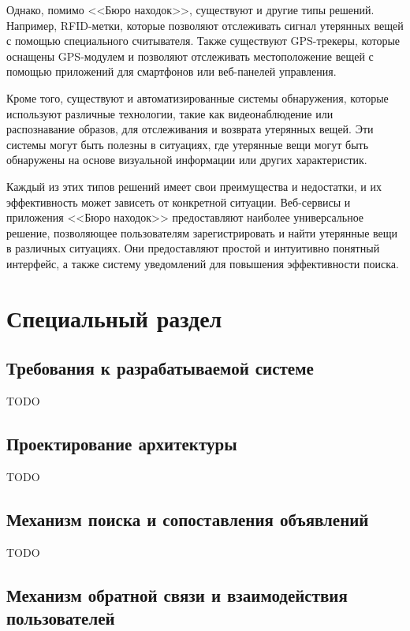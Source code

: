\documentclass{mirea}
\begin{document}
Однако, помимо <<Бюро находок>>, существуют и другие типы решений. Например, RFID-метки, которые позволяют отслеживать сигнал утерянных вещей с помощью специального считывателя. Также существуют GPS-трекеры, которые оснащены GPS-модулем и позволяют отслеживать местоположение вещей с помощью приложений для смартфонов или веб-панелей управления.

Кроме того, существуют и автоматизированные системы обнаружения, которые используют различные технологии, такие как видеонаблюдение или распознавание образов, для отслеживания и возврата утерянных вещей. Эти системы могут быть полезны в ситуациях, где утерянные вещи могут быть обнаружены на основе визуальной информации или других характеристик.

Каждый из этих типов решений имеет свои преимущества и недостатки, и их эффективность может зависеть от конкретной ситуации. Веб-сервисы и приложения <<Бюро находок>> предоставляют наиболее универсальное решение, позволяющее пользователям зарегистрировать и найти утерянные вещи в различных ситуациях. Они предоставляют простой и интуитивно понятный интерфейс, а также систему уведомлений для повышения эффективности поиска.

\section{Специальный раздел}

\subsection{Требования к разрабатываемой системе}

TODO

\subsection{Проектирование архитектуры}

TODO

\subsection{Механизм поиска и сопоставления объявлений}

TODO

\subsection{Механизм обратной связи и взаимодействия пользователей}
\end{document}
